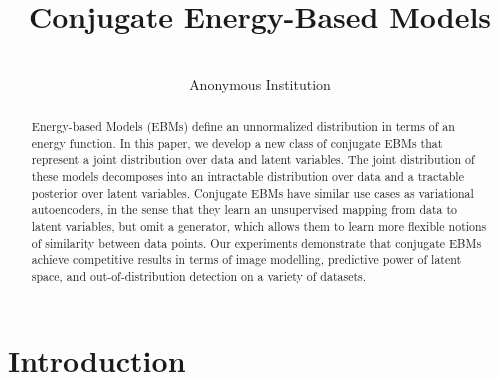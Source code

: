\documentclass[tablecaption=bottom,wcp]{jmlr} %
\title[Conjugate Energy-Based Models]{Conjugate Energy-Based Models}
\author{\Name{Anonymous Authors}\\
  \addr Anonymous Institution}
\begin{document}
\maketitle

\begin{abstract}
Energy-based Models (EBMs) define an unnormalized distribution in terms of an energy function. In this paper, we develop a new class of conjugate EBMs that represent a joint distribution over data and latent variables. The joint distribution of these models decomposes into an intractable distribution over data and a tractable posterior over latent variables. Conjugate EBMs have similar use cases as variational autoencoders, in the sense that they learn an unsupervised mapping from data to latent variables, but omit a generator, which allows them to learn more flexible notions of similarity between data points. Our experiments demonstrate that conjugate EBMs achieve competitive results in terms of image modelling, predictive power of latent space, and out-of-distribution detection on a variety of datasets. \end{abstract}


\section{Introduction}
\label{sec:intro}


\end{document}
